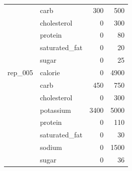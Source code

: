 \begin{tabular}{@{}clrr@{}}
 & carb & 300 & 500 \\
 & cholesterol & 0 & 300 \\
 & protein & 0 & 80 \\
 & saturated\_fat & 0 & 20 \\
 & sugar & 0 & 25 \\
\midrule
rep\_005 & calorie & 0 & 4900 \\
 & carb & 450 & 750 \\
 & cholesterol & 0 & 300 \\
 & potassium & 3400 & 5000 \\
 & protein & 0 & 110 \\
 & saturated\_fat & 0 & 30 \\
 & sodium & 0 & 1500 \\
 & sugar & 0 & 36 \\
\bottomrule
\end{tabular}
